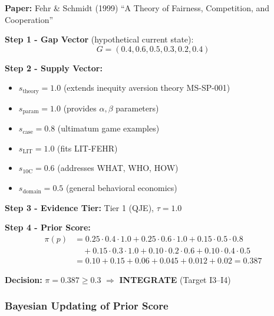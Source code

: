 \begin{tcolorbox}[colback=yellow!5!white, colframe=yellow!75!black,
    title=\textbf{Example: Prior Score Computation}]

\textbf{Paper:} Fehr \& Schmidt (1999) ``A Theory of Fairness, Competition, and Cooperation''

\textbf{Step 1 - Gap Vector} (hypothetical current state):
\begin{equation}
G = (0.4, 0.6, 0.5, 0.3, 0.2, 0.4)
\end{equation}

\textbf{Step 2 - Supply Vector:}
\begin{itemize}[nosep]
    \item $s_{\text{theory}} = 1.0$ (extends inequity aversion theory MS-SP-001)
    \item $s_{\text{param}} = 1.0$ (provides $\alpha, \beta$ parameters)
    \item $s_{\text{case}} = 0.8$ (ultimatum game examples)
    \item $s_{\text{LIT}} = 1.0$ (fits LIT-FEHR)
    \item $s_{\text{10C}} = 0.6$ (addresses WHAT, WHO, HOW)
    \item $s_{\text{domain}} = 0.5$ (general behavioral economics)
\end{itemize}

\textbf{Step 3 - Evidence Tier:} Tier 1 (QJE), $\tau = 1.0$

\textbf{Step 4 - Prior Score:}
\begin{align}
\pi(p) &= 0.25 \cdot 0.4 \cdot 1.0 + 0.25 \cdot 0.6 \cdot 1.0 + 0.15 \cdot 0.5 \cdot 0.8 \\
       &\quad + 0.15 \cdot 0.3 \cdot 1.0 + 0.10 \cdot 0.2 \cdot 0.6 + 0.10 \cdot 0.4 \cdot 0.5 \\
       &= 0.10 + 0.15 + 0.06 + 0.045 + 0.012 + 0.02 = \mathbf{0.387}
\end{align}

\textbf{Decision:} $\pi = 0.387 \geq 0.3$ $\Rightarrow$ \textbf{INTEGRATE} (Target I3--I4)

\end{tcolorbox}


\subsubsection{Bayesian Updating of Prior Score}

